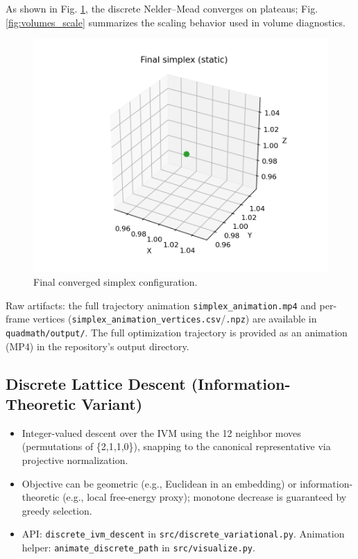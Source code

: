 \documentclass[
]{article}
\providecommand{\tightlist}{%
  \setlength{\itemsep}{0pt}\setlength{\parskip}{0pt}}
\begin{document}
As shown in Fig. \ref{fig:simplex_final}, the discrete Nelder--Mead
converges on plateaus; Fig. \ref{fig:volumes_scale} summarizes the
scaling behavior used in volume diagnostics.

\begin{figure}
\hypertarget{fig:simplex_final}{%
\centering
\includegraphics{../output/simplex_final.png}
\caption{Final converged simplex
configuration.}\label{fig:simplex_final}
}
\end{figure}

Raw artifacts: the full trajectory animation
\texttt{simplex\_animation.mp4} and per-frame vertices
(\texttt{simplex\_animation\_vertices.csv}/\texttt{.npz}) are available
in \texttt{quadmath/output/}. The full optimization trajectory is
provided as an animation (MP4) in the repository's output directory.

\hypertarget{discrete-lattice-descent-information-theoretic-variant}{%
\subsection{Discrete Lattice Descent (Information-Theoretic
Variant)}\label{discrete-lattice-descent-information-theoretic-variant}}

\begin{itemize}
\tightlist
\item
  Integer-valued descent over the IVM using the 12 neighbor moves
  (permutations of \{2,1,1,0\}), snapping to the canonical
  representative via projective normalization.
\item
  Objective can be geometric (e.g., Euclidean in an embedding) or
  information-theoretic (e.g., local free-energy proxy); monotone
  decrease is guaranteed by greedy selection.
\item
  API: \texttt{discrete\_ivm\_descent} in
  \texttt{src/discrete\_variational.py}. Animation helper:
  \texttt{animate\_discrete\_path} in \texttt{src/visualize.py}.
\end{itemize}
\end{document}
